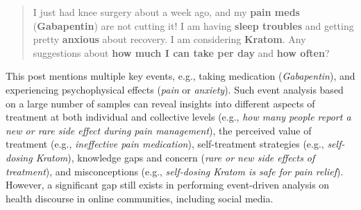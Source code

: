 \documentclass[letterpaper]{article} %
\begin{document}
\begin{quote}
   I just had knee surgery about a week ago, and my \textbf{pain meds }(\textbf{Gabapentin}) are not cutting it! I am having \textbf{sleep troubles} and getting pretty \textbf{anxious} about recovery. I am considering \textbf{Kratom}. Any suggestions about \textbf{how much I can take per day} and \textbf{how often}?
\end{quote}
This post mentions multiple key events, e.g., taking medication (\textit{Gabapentin}), and experiencing psychophysical effects (\textit{pain} or \textit{anxiety}). Such event analysis based on a large number of samples can reveal insights into different aspects of treatment at both individual and collective levels (e.g., \textit{how many people report a new or rare side effect during pain management}), the perceived value of treatment (e.g., \textit{ineffective pain medication}),  self-treatment strategies (e.g., \textit{self-dosing Kratom}), knowledge gaps and concern (\textit{rare or new side effects of treatment}), and misconceptions (e.g., \textit{self-dosing Kratom is safe for pain relief}). However, a significant gap still exists in performing event-driven analysis on health discourse in online communities, including social media. 



\end{document}
